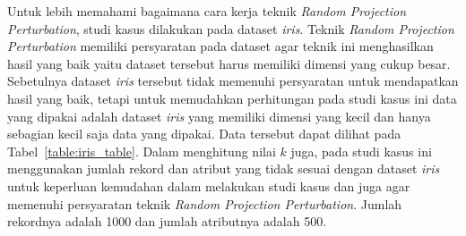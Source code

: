 Untuk lebih memahami bagaimana cara kerja teknik \textit{Random Projection Perturbation}, studi kasus dilakukan pada dataset \textit{iris}. Teknik \textit{Random Projection Perturbation} memiliki persyaratan pada dataset agar teknik ini menghasilkan hasil yang baik yaitu dataset tersebut harus memiliki dimensi yang cukup besar. Sebetulnya dataset \textit{iris} tersebut tidak memenuhi persyaratan untuk mendapatkan hasil yang baik, tetapi untuk memudahkan perhitungan pada studi kasus ini data yang dipakai adalah dataset \textit{iris} yang memiliki dimensi yang kecil dan hanya sebagian kecil saja data yang dipakai. Data tersebut dapat dilihat pada Tabel~\ref{table:iris_table}. Dalam menghitung nilai \(k\) juga, pada studi kasus ini menggunakan jumlah rekord dan atribut yang tidak sesuai dengan dataset \textit{iris} untuk keperluan kemudahan dalam melakukan studi kasus dan juga agar memenuhi persyaratan teknik \textit{Random Projection Perturbation}. Jumlah rekordnya adalah 1000 dan jumlah atributnya adalah 500.

